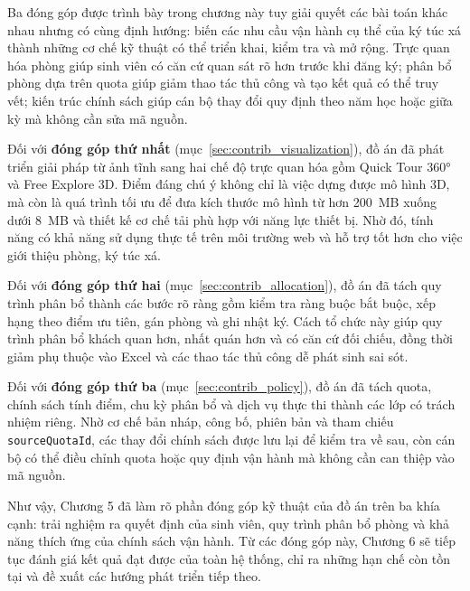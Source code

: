 \documentclass[../DoAn.tex]{subfiles}
\begin{document}
Ba đóng góp được trình bày trong chương này tuy giải quyết các bài toán khác
nhau nhưng có cùng định hướng: biến các nhu cầu vận hành cụ thể của ký túc xá
thành những cơ chế kỹ thuật có thể triển khai, kiểm tra và mở rộng. Trực quan
hóa phòng giúp sinh viên có căn cứ quan sát rõ hơn trước khi đăng ký; phân bổ
phòng dựa trên quota giúp giảm thao tác thủ công và tạo kết quả có thể truy
vết; kiến trúc chính sách giúp cán bộ thay đổi quy định theo năm học hoặc giữa
kỳ mà không cần sửa mã nguồn.

Đối với \textbf{đóng góp thứ nhất} (mục~\ref{sec:contrib_visualization}), đồ án
đã phát triển giải pháp từ ảnh tĩnh sang hai chế độ trực quan hóa gồm Quick
Tour 360° và Free Explore 3D. Điểm đáng chú ý không chỉ là việc dựng được mô
hình 3D, mà còn là quá trình tối ưu để đưa kích thước mô hình từ hơn 200~MB
xuống dưới 8~MB và thiết kế cơ chế tải phù hợp với năng lực thiết bị. Nhờ đó,
tính năng có khả năng sử dụng thực tế trên môi trường web và hỗ trợ tốt hơn cho
việc giới thiệu phòng, ký túc xá.

Đối với \textbf{đóng góp thứ hai} (mục~\ref{sec:contrib_allocation}), đồ án đã
tách quy trình phân bổ thành các bước rõ ràng gồm kiểm tra ràng buộc bắt buộc,
xếp hạng theo điểm ưu tiên, gán phòng và ghi nhật ký. Cách tổ chức này giúp
quy trình phân bổ khách quan hơn, nhất quán hơn và có căn cứ đối chiếu, đồng
thời giảm phụ thuộc vào Excel và các thao tác thủ công dễ phát sinh sai sót.

Đối với \textbf{đóng góp thứ ba} (mục~\ref{sec:contrib_policy}), đồ án đã tách
quota, chính sách tính điểm, chu kỳ phân bổ và dịch vụ thực thi thành các lớp
có trách nhiệm riêng. Nhờ cơ chế bản nháp, công bố, phiên bản và tham chiếu
\texttt{sourceQuotaId}, các thay đổi chính sách được lưu lại để kiểm tra về
sau, còn cán bộ có thể điều chỉnh quota hoặc quy định vận hành mà không cần
can thiệp vào mã nguồn.

Như vậy, Chương 5 đã làm rõ phần đóng góp kỹ thuật của đồ án trên ba khía
cạnh: trải nghiệm ra quyết định của sinh viên, quy trình phân bổ phòng và khả
năng thích ứng của chính sách vận hành. Từ các đóng góp này, Chương 6 sẽ tiếp
tục đánh giá kết quả đạt được của toàn hệ thống, chỉ ra những hạn chế còn tồn
tại và đề xuất các hướng phát triển tiếp theo.
\end{document}
